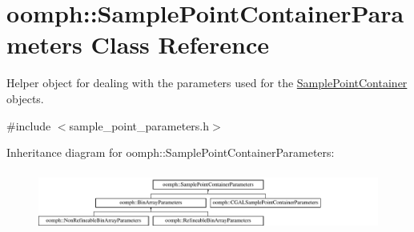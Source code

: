 \hypertarget{classoomph_1_1SamplePointContainerParameters}{}\section{oomph\+:\+:Sample\+Point\+Container\+Parameters Class Reference}
\label{classoomph_1_1SamplePointContainerParameters}


Helper object for dealing with the parameters used for the \hyperlink{classSamplePointContainer}{Sample\+Point\+Container} objects.  




{\ttfamily \#include $<$sample\+\_\+point\+\_\+parameters.\+h$>$}

Inheritance diagram for oomph\+:\+:Sample\+Point\+Container\+Parameters\+:\begin{figure}[H]
\begin{center}
\leavevmode
\includegraphics[height=1.964912cm]{classoomph_1_1SamplePointContainerParameters}
\end{center}
\end{figure}
